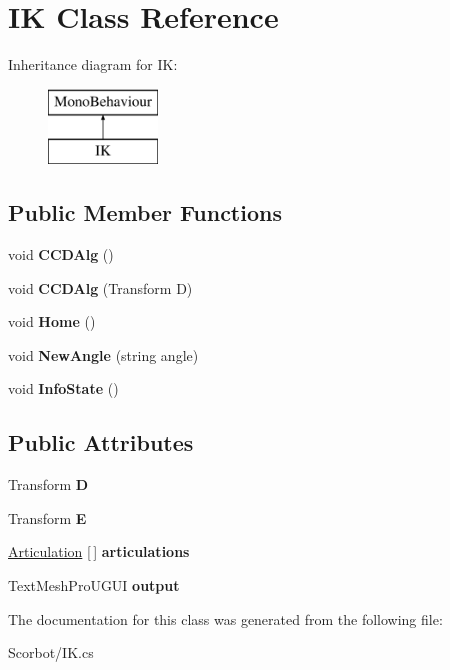 \hypertarget{class_i_k}{}\section{IK Class Reference}
\label{class_i_k}
Inheritance diagram for IK\+:\begin{figure}[H]
\begin{center}
\leavevmode
\includegraphics[height=2.000000cm]{class_i_k}
\end{center}
\end{figure}
\subsection*{Public Member Functions}
\begin{DoxyCompactItemize}
\item 
\mbox{\label{class_i_k_a2851f5e1a9b0a873b45c76b9a86f01db}} 
void {\bfseries C\+C\+D\+Alg} ()
\item 
\mbox{\label{class_i_k_aa28704730e12709936ba319e326a4173}} 
void {\bfseries C\+C\+D\+Alg} (Transform D)
\item 
\mbox{\label{class_i_k_a9e1f61ec276422f5a0aa2a64f6fd44b4}} 
void {\bfseries Home} ()
\item 
\mbox{\label{class_i_k_ad48b219e67be6512bc8bc9ced2a8c8fc}} 
void {\bfseries New\+Angle} (string angle)
\item 
\mbox{\label{class_i_k_ab6f47cd339d2f8b3fec2f56f9c1f8729}} 
void {\bfseries Info\+State} ()
\end{DoxyCompactItemize}
\subsection*{Public Attributes}
\begin{DoxyCompactItemize}
\item 
\mbox{\label{class_i_k_aeda196da26592113cfbeb37ce08c98e0}} 
Transform {\bfseries D}
\item 
\mbox{\label{class_i_k_abfcf0b83294daebc45f90599cefa6229}} 
Transform {\bfseries E}
\item 
\mbox{\label{class_i_k_a57627b5cca74a00c64e634a594ce1771}} 
\mbox{\hyperlink{class_articulation}{Articulation}} \mbox{[}$\,$\mbox{]} {\bfseries articulations}
\item 
\mbox{\label{class_i_k_a7044698957fd78879f6b426e3e8f1265}} 
Text\+Mesh\+Pro\+U\+G\+UI {\bfseries output}
\end{DoxyCompactItemize}


The documentation for this class was generated from the following file\+:\begin{DoxyCompactItemize}
\item 
Scorbot/I\+K.\+cs\end{DoxyCompactItemize}
